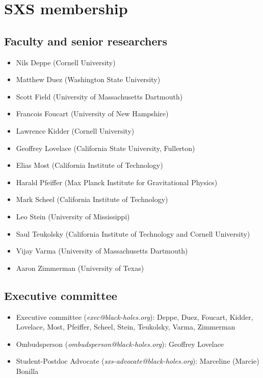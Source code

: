 \documentclass[12pt]{article}
\newcommand{\advocate}[0]{Marceline (Marcie) Bonilla}
\newcommand{\ombudsperson}[0]{Geoffrey Lovelace}
\begin{document}
\section{SXS membership}
\subsection{Faculty and senior researchers}\label{sec:member_faculty}

\begin{itemize}
  \setlength\itemsep{-0.25em}
\item Nils Deppe (Cornell University)
\item Matthew Duez (Washington State University)
\item Scott Field (University of Massachusetts Dartmouth)
\item Francois Foucart (University of New Hampshire)
\item Lawrence Kidder (Cornell University)
\item Geoffrey Lovelace (California State University, Fullerton)
\item Elias Most (California Institute of Technology)
\item Harald Pfeiffer (Max Planck Institute for Gravitational Physics)
\item Mark Scheel (California Institute of Technology)
\item Leo Stein (University of Mississippi)
\item Saul Teukolsky (California Institute of Technology and Cornell University)
\item Vijay Varma (University of Massachusetts Dartmouth)
\item Aaron Zimmerman (University of Texas)
\end{itemize}

\subsection{Executive committee}\label{sec:executive_committee_members}
\begin{itemize}
  \setlength\itemsep{-0.25em}
\item Executive committee (\emph{exec@black-holes.org}): Deppe, Duez,
  Foucart, Kidder, Lovelace, Most, Pfeiffer, Scheel, Stein, Teukolsky,
  Varma, Zimmerman
\item Ombudsperson (\emph{ombudsperson@black-holes.org}): \ombudsperson{}
\item Student-Postdoc Advocate (\emph{sxs-advocate@black-holes.org}):
  \advocate{}
\end{itemize}
\end{document}
